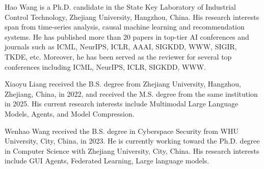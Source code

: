 \vspace{-3em}

\begin{IEEEbiography}{Hao Wang}
is a Ph.D. candidate in the State Key Laboratory of Industrial Control Technology, Zhejiang University, Hangzhou, China. 
His research interests span from time-series analysis, causal machine learning and recommendation systems.
He has published more than 20 papers in top-tier AI conferences and journals such as ICML, NeurIPS, ICLR, AAAI, SIGKDD, WWW, SIGIR, TKDE, etc.
Moreover, he has been served as the reviewer for several top conferences including ICML, NeurIPS, ICLR, SIGKDD, WWW.
\end{IEEEbiography}

\vspace{-3em}

\begin{IEEEbiography}{Xiaoyu Liang}
received the B.S. degree from Zhejiang University, Hangzhou, Zhejiang, China, in 2022, and received the M.S. degree from the same institution in 2025. His current research interests include Multimodal Large Language Models, Agents, and Model Compression.
\end{IEEEbiography}

\vspace{-3em}

\begin{IEEEbiography}{Wenhao Wang}
received the B.S. degree in Cyberspace Security from WHU University, City, China, in 2023. He is currently working toward the Ph.D. degree in Computer Science with Zhejiang University, City, China. His research interests include GUI Agents, Federated Learning, Large language models.
\end{IEEEbiography}

